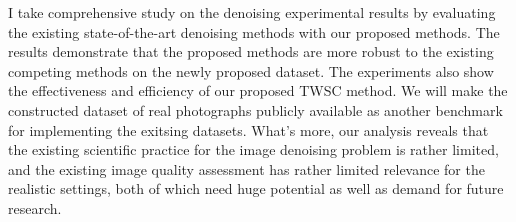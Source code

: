 I take comprehensive study on the denoising experimental results by evaluating the existing state-of-the-art denoising methods with our proposed methods. The results demonstrate that the proposed methods are more robust to the existing competing methods on the newly proposed dataset. The experiments also show the effectiveness and efficiency of our proposed TWSC method. We will make the constructed dataset of real photographs publicly available as another benchmark for implementing the exitsing datasets. What's more, our analysis reveals that the existing scientific practice for the image denoising problem is rather limited, and the existing image quality assessment has rather limited relevance for the realistic settings, both of which need huge potential as well as demand for future research.






















